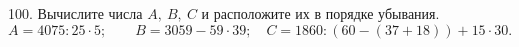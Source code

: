 100. Вычислите числа $A,\ B,\ C$ и расположите их в порядке убывания.\\
$A=4075:25\cdot5; \qquad B=3059-59\cdot39; \quad C=1860:(60-(37+18))+15\cdot30.$\\
